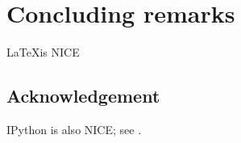 \section{Concluding remarks}

\LaTeX is NICE

\subsection*{Acknowledgement}
IPython is also NICE; see \cite{ipython}.